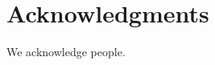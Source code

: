 \documentclass[conference,compsoc]{IEEEtran}
\begin{document}
\IEEEpeerreviewmaketitle
    
    
    
    
    

    \section*{Acknowledgments}
    We acknowledge people. 

    \FloatBarrier
    
    
\end{document}
